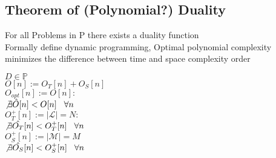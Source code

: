 \documentclass[11pt]{article}
\begin{document}













\subsection{Theorem of (Polynomial?) Duality}
For all Problems in P there exists a duality function\\
Formally define dynamic programming, Optimal polynomial complexity minimizes the difference between time and space complexity order
\begin{center}
\vspace{2mm}
$
D \in \mathbb{P}
$
\\ \vspace{2mm}
$
O[n] := O_T[n] + O_S[n]
$
\\ \vspace{2mm}
$
O_{opt}[n] := O[n] :
$
\\ \vspace{2mm}
$
\not \exists \hat{O} \lbrack n \rbrack < O[n] \hspace{3mm} \forall n
$
\\ \vspace{6mm}
$
O_T^+[n] := |\mathcal{L}| = N :
$
\\ \vspace{2mm}
$
\not \exists \hat{O_T} \lbrack n \rbrack < O^+_{T}[n] \hspace{3mm} \forall n
$
\\ \vspace{2mm}
$
O_S^+[n] := |\mathcal{M}| = M
$
\\ \vspace{2mm}
$
\not \exists \hat{O_S} \lbrack n \rbrack < O^+_{S}[n] \hspace{3mm} \forall n
$
\end{center}







\end{document}
